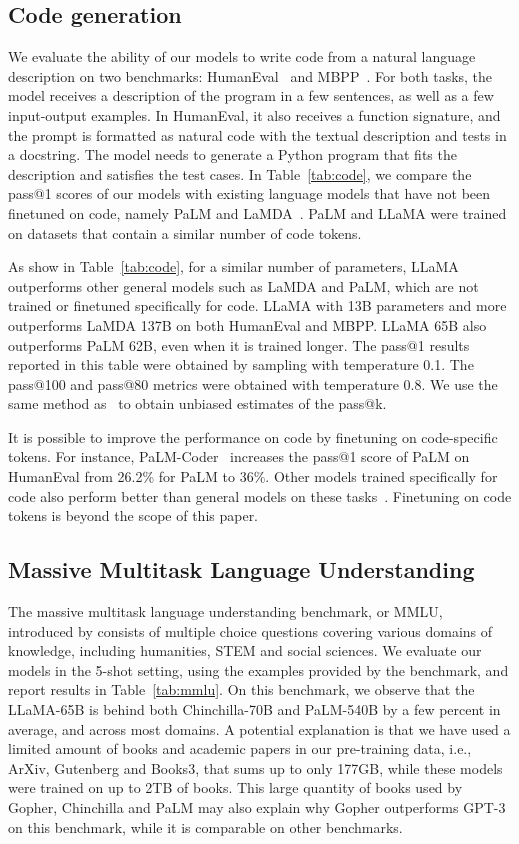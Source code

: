 \subsection{Code generation}
\label{sec:codegen}
We evaluate the ability of our models to write code from a natural language description on two benchmarks: HumanEval~\cite{chen2021Evaluating} and MBPP~\cite{austin2021program}. For both tasks, the model receives a description of the program in a few sentences, as well as a few input-output examples. In HumanEval, it also receives a function signature, and the prompt is formatted as natural code with the textual description and tests in a docstring. The model needs to generate a Python program that fits the description and satisfies the test cases. In Table~\ref{tab:code}, we compare the pass@1 scores of our models with existing language models that have not been finetuned on code, namely PaLM and LaMDA~\cite{thoppilan2022lambda}. PaLM and LLaMA were trained on datasets that contain a similar number of code tokens.

As show in Table~\ref{tab:code}, for a similar number of parameters, LLaMA outperforms other general models such as LaMDA and PaLM, which are not trained or finetuned specifically for code. LLaMA with 13B parameters and more outperforms LaMDA 137B on both HumanEval and MBPP. LLaMA 65B also outperforms PaLM 62B, even when it is trained longer. The pass@1 results reported in this table were obtained by sampling with temperature 0.1. The pass@100 and pass@80 metrics were obtained with temperature 0.8. We use the same method as~\citet{chen2021Evaluating} to obtain unbiased estimates of the pass@k.

It is possible to improve the performance on code by finetuning on code-specific tokens. For instance, PaLM-Coder~\citep{chowdhery2022palm} increases the pass@1 score of PaLM on HumanEval from 26.2\% for PaLM to 36\%.
Other models trained specifically for code also perform better than general models on these tasks~\citep{chen2021Evaluating,nijkamp2022codegen,fried2022incoder}. Finetuning on code tokens is beyond the scope of this paper.

\subsection{Massive Multitask Language Understanding} The massive multitask language understanding benchmark, or MMLU, introduced by \citet{hendrycks2020measuring} consists of multiple choice questions covering various domains of knowledge, including humanities, STEM and social sciences. We evaluate our models in the 5-shot setting, using the examples provided by the benchmark, and report results in Table~\ref{tab:mmlu}.
On this benchmark, we observe that the LLaMA-65B is behind both Chinchilla-70B and PaLM-540B by a few percent in average, and across most domains. A potential explanation is that we have used a limited amount of books and academic papers in our pre-training data, i.e., ArXiv, Gutenberg and Books3, that sums up to only 177GB, while these models were trained on up to 2TB of books. This large quantity of books used by Gopher, Chinchilla and PaLM may also explain why Gopher outperforms GPT-3 on this benchmark, while it is comparable on other benchmarks.


